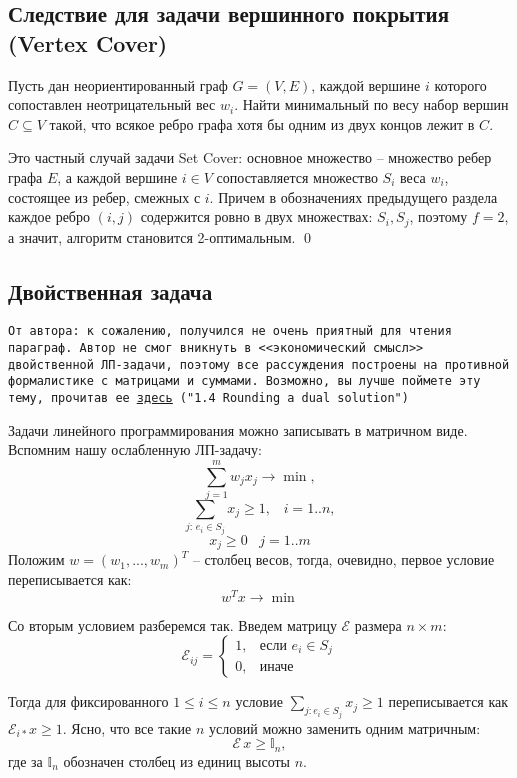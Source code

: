 \subsection{Следствие для задачи вершинного покрытия (Vertex Cover)}
 {Пусть дан неориентированный граф $G = (V, E)$, каждой вершине $i$ которого сопоставлен неотрицательный вес $w_i$. Найти минимальный по весу набор вершин $C \subseteq V$ такой, что всякое ребро графа хотя бы одним из двух концов лежит в $C$.} 

 Это частный случай задачи Set Cover: основное множество -- множество ребер графа $E$, а каждой вершине $i \in V$ сопоставляется множество $S_i$ веса $w_i$, состоящее из ребер, смежных с $i$. Причем в обозначениях предыдущего раздела каждое ребро $(i, j)$ содержится ровно в двух множествах: $S_i, S_j$, поэтому $f = 2$, а значит, алгоритм становится 2-оптимальным. \qed

\subsection{Двойственная задача}
\texttt{От автора: к сожалению, получился не очень приятный для чтения параграф. Автор не смог вникнуть в <<экономический смысл>> двойственной ЛП-задачи, поэтому все рассуждения построены на противной формалистике с матрицами и суммами. Возможно, вы лучше поймете эту тему, прочитав ее
\texttt{\href{https://www.designofapproxalgs.com/book.pdf}{\underline{здесь}}} 
("1.4 Rounding a dual solution")
}

Задачи линейного программирования можно записывать в матричном виде. Вспомним нашу ослабленную ЛП-задачу:
$$ \sum_{j=1}^m w_j x_j \rightarrow \min,$$
$$ \sum_{j:\, e_i \in S_j} x_j \geq 1, \;\;\; i=1..n,$$
$$ x_j \geq 0 \;\;\; j=1..m$$
Положим $w = (w_1, ..., w_m)^T$ -- столбец весов, тогда, очевидно, первое условие переписывается как: $$w^Tx \rightarrow \min$$

Со вторым условием разберемся так. Введем матрицу $\mathcal E$ размера $n \times m$:
$$
\mathcal{E}_{ij} = \begin{cases}
1, & \text{если } e_i \in S_j \\
0, & \text{иначе}
\end{cases}
$$

Тогда для фиксированного $1\leq i \leq n$ условие $\sum\limits_{j: e_i \in S_j} x_j \geq 1$ переписывается как $\mathcal{E}_{i*} x \geq 1$. Ясно, что все такие $n$ условий можно заменить одним матричным: $$\mathcal{E}\,x \geq \mathbb I_n,$$ где за $\mathbb I_n$ обозначен столбец из единиц высоты $n$.

